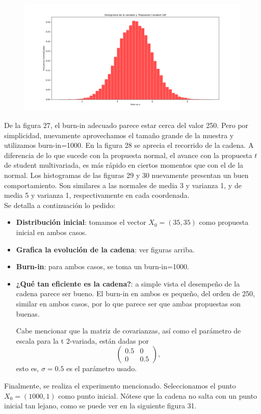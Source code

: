 \documentclass[letterpaper]{article}
\newcommand{\1}{\mathds{1}}
\theoremstyle{definition}
\theoremstyle{definition}
\theoremstyle{definition}
\theoremstyle{definition}
\theoremstyle{definition}
\begin{document}
    \begin{figure}[h!]
        \centering
        \includegraphics[width=\linewidth]{30.png}
        \caption{}
    \end{figure} 
    De la figura  27, el burn-in adecuado parece estar cerca del valor 250. Pero por simplicidad, nuevamente aprovechamos 
    el tamaño grande de la muestra y utilizamos burn-in=1000. En la figura 28 se aprecia el recorrido de la cadena. A diferencia de lo que  sucede 
    con la propuesta normal, el avance con la propuesta $t$ de student multivariada, es más rápido en ciertos momentos que con el de la normal.
    Los histogramas de las figuras 29 y 30 nuevamente presentan un buen comportamiento. Son similares a las normales 
    de media 3 y varianza 1, y de media 5 y varianza 1, respectivamente en cada coordenada.\\
    
    Se detalla a continuación lo pedido:
    \begin{itemize}
        \item \textbf{Distribución inicial}: tomamos el vector $X_0=(35,35)$ como propuesta inicial en ambos casos.
        \item \textbf{Grafica la evolución de la cadena}: ver figuras arriba.
        \item \textbf{Burn-in}: para ambos casos, se toma un burn-in=1000.
        \item \textbf{¿Qué tan eficiente es la cadena?}: a simple vista el desempeño de la cadena parece ser bueno. El burn-in en ambos es pequeño, del orden 
        de 250, similar en ambos casos, por lo que parece ser que ambas propuestas son buenas.

        Cabe mencionar que la matriz de covarianzas, así como el parámetro de escala para la t 2-variada, están dadas por 
        \[
        \begin{pmatrix}
            0.5 & 0\\
            0 & 0.5
        \end{pmatrix},    
        \]
        esto es, $\sigma=0.5$ es el parámetro usado.
    \end{itemize}
    Finalmente, se realiza el experimento mencionado. Seleccionamos el punto $X_0=(1000,1)$ como punto inicial. Nótese que la cadena no salta con un punto inicial tan 
    lejano, como se puede ver en la siguiente figura 31.
\end{document}
